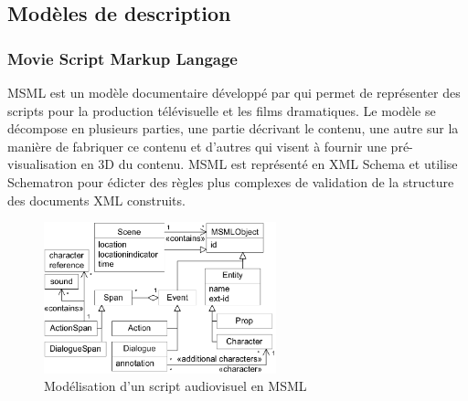 \subsection{Modèles de description }\label{sec:plan}



\subsubsection{Movie Script Markup Langage}\label{sec:msml}
MSML est un modèle documentaire développé par \cite{VanRijsselbergen2009} qui permet de représenter des scripts pour la production télévisuelle et les films dramatiques. 
Le modèle se décompose en plusieurs parties, une partie décrivant le contenu, une autre sur la manière de fabriquer ce contenu et d'autres qui visent à fournir une pré-visualisation en 3D du contenu.
MSML est représenté en XML Schema et utilise Schematron  pour édicter des règles plus complexes de validation de la structure des documents XML construits.

\begin{figure}[ht!]
\centering
\includegraphics[width=0.6\textwidth]{images/MSML-sceneModel.png}
\caption{Modélisation d'un script audiovisuel en MSML}
\label{img:msml-model}
\end{figure}

